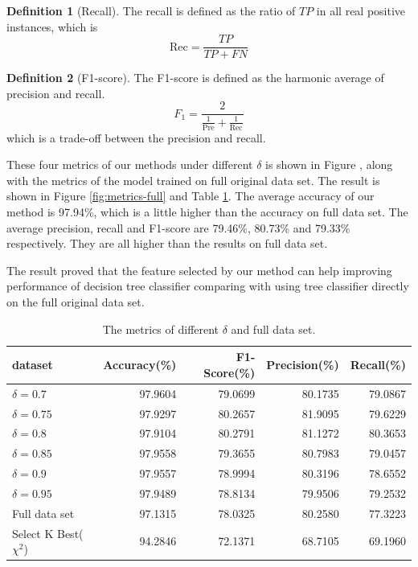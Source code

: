 \documentclass{ieeeaccess}
\theoremstyle{definition}
\newtheorem{defn}{Definition}
\begin{document}
\begin{defn}[Recall]
    The recall is defined as the ratio of $TP$ in all real positive instances, which is
    \begin{equation}
        \text{Rec} = \frac{TP}{TP+FN}
    \end{equation}
\end{defn}

\begin{defn}[F1-score]
    The F1-score is defined as the harmonic average of precision and recall.
    \begin{equation}
        F_1 = \frac{2}{\frac{1}{\text{Pre}} + \frac{1}{\text{Rec}}}
    \end{equation}
    which is a trade-off between the precision and recall.
\end{defn}

These four metrics of our methods under different $\delta$ is shown in Figure , along with the metrics of the model trained on full original data set. The result is shown in Figure \ref{fig:metrics-full} and Table \ref{tab:metric-full}. The average accuracy of our method is 97.94\%, which is a little higher than the accuracy on full data set. The average precision, recall and F1-score are 79.46\%, 80.73\% and 79.33\% respectively. They are all higher than the results on full data set. 

The result proved that the feature selected by our method can help improving performance of decision tree classifier comparing with using tree classifier directly on the full original data set.

\begin{table}
    \centering
    \caption{The metrics of different $\delta$ and full data set.}
    \label{tab:metric-full}
    \begin{tabular}{lrrrr}
        \toprule
        dataset & Accuracy(\%) & F1-Score(\%) & Precision(\%) & Recall(\%) \\
        \midrule
            $\delta=0.7$ &  97.9604 & 79.0699 & 80.1735 & 79.0867 \\
            $\delta=0.75$ &	97.9297 & 80.2657 & 81.9095 & 79.6229 \\
            $\delta=0.8$ &	97.9104 & 80.2791 & 81.1272 & 80.3653 \\
            $\delta=0.85$ &	97.9558 & 79.3655 & 80.7983 & 79.0457 \\
            $\delta=0.9$ &  97.9557 & 78.9994 & 80.3196 & 78.6552 \\
            $\delta=0.95$ &	97.9489 & 78.8134 & 79.9506 & 79.2532 \\
            Full data set &	97.1315 & 78.0325 & 80.2580 & 77.3223 \\
            Select K Best($\chi^2$) & 94.2846 & 72.1371 & 68.7105 & 69.1960 \\
        \bottomrule
    \end{tabular}
\end{table}
\end{document}
